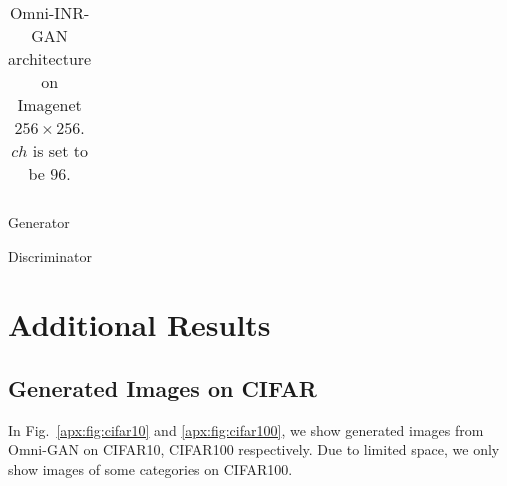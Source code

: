 \documentclass[paper_2425.tex]{subfiles}
\begin{document}
\begin{table*}[htbp]
\begin{subtable}[t]{0.48\linewidth}
{\begin{tabular}{c}
      \end{tabular}}
    \caption{Generator}
  \end{subtable}
  \centering
  \begin{subtable}[t]{0.48\linewidth}
    \centering
    \caption{Discriminator}
  \end{subtable}
  \caption{Omni-INR-GAN architecture on Imagenet $256\times256$. $ch$ is set to be $96$.}
  \label{apx:tab:omniinrgan_imagenet256}
\end{table*}





\section{Additional Results}

\subsection{Generated Images on CIFAR}

In Fig.~\ref{apx:fig:cifar10} and \ref{apx:fig:cifar100}, we show generated images from Omni-GAN on CIFAR10, CIFAR100 respectively. Due to limited space, we only show images of some categories on CIFAR100.
\end{document}
